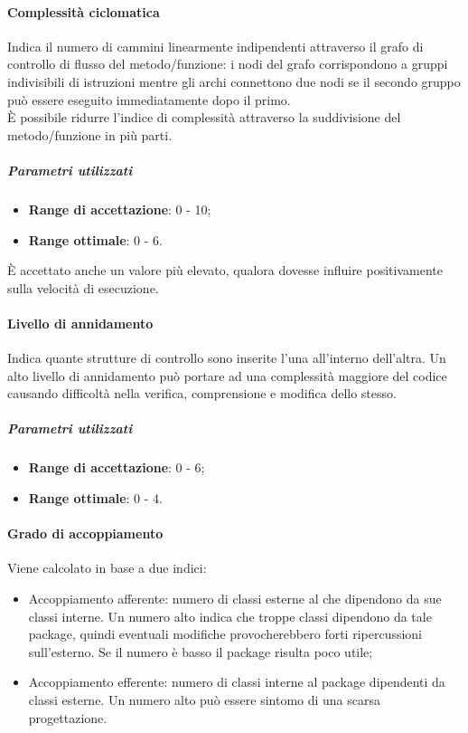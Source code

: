 \documentclass[../PianoDiQualifica.tex]{subfiles}
\begin{document}
				\paragraph{Complessità ciclomatica\\}
					Indica il numero di cammini linearmente indipendenti attraverso il
					grafo di controllo di flusso del metodo/funzione: i nodi del grafo
					corrispondono a gruppi indivisibili di istruzioni mentre gli archi
					connettono due nodi se il secondo gruppo può essere eseguito
					immediatamente dopo il primo.\\
					È possibile ridurre l'indice di complessità attraverso la
					suddivisione del metodo/funzione in più parti.
					\subparagraph{Parametri utilizzati}
						\begin{itemize}
							\item \textbf{Range di accettazione}: 0 - 10;
							\item \textbf{Range ottimale}: 0 - 6.
						\end{itemize}
						\par È accettato anche un valore più elevato, qualora
						dovesse influire positivamente sulla velocità di esecuzione.
				\paragraph{Livello di annidamento\\}
					Indica quante strutture di controllo sono inserite l'una all'interno
					dell'altra. Un alto livello di annidamento può portare ad una
					complessità maggiore del codice causando difficoltà nella verifica,
					comprensione e modifica dello stesso.
					\subparagraph{Parametri utilizzati}
						\begin{itemize}
							\item \textbf{Range di accettazione}: 0 - 6;
							\item \textbf{Range ottimale}: 0 - 4.
						\end{itemize}
				\paragraph{Grado di accoppiamento\\}
					Viene calcolato in base a due indici:
					\begin{itemize}
						\item Accoppiamento afferente: numero di classi esterne
						al  che dipendono da sue classi interne. Un numero
						alto indica che troppe classi dipendono da tale package, quindi
						eventuali modifiche provocherebbero forti ripercussioni
						sull'esterno. Se il numero è basso il package risulta poco
						utile;
						\item Accoppiamento efferente: numero di classi interne
						al package dipendenti da classi esterne. Un numero alto può
						essere sintomo di una scarsa progettazione.
					\end{itemize}
\end{document}
